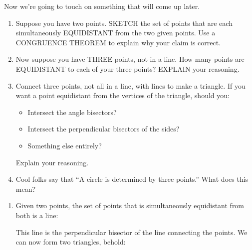 \documentclass[nooutcomes,noauthor,handout,12pt]{ximera}
\begin{document}
\begin{question}
  Now we're going to touch on something that will come up later.
  \begin{enumerate}
  \item Suppose you have two points. SKETCH the set of points that are
    each simultaneously EQUIDISTANT from the two given points. Use a
    CONGRUENCE THEOREM to explain why your claim is correct.
  \item Now suppose you have THREE points, not in a line. How many
    points are EQUIDISTANT to each of your three points? EXPLAIN your
    reasoning.
  \item Connect three points, not all in a line, with lines to make a
    triangle. If you want a point equidistant from the vertices of the
    triangle, should you:
    \begin{itemize}
    \item Intersect the angle bisectors?
    \item Intersect the perpendicular bisectors of the sides?
    \item Something else entirely?
    \end{itemize}
    Explain your reasoning.
  \item Cool folks say that ``A circle is determined by three
    points.'' What does this mean?
  \end{enumerate}
  \begin{freeResponse}
    \begin{enumerate}
    \item Given two points, the set of points that is simultaneously
      equidistant from both is a line:
      \begin{center}
      \end{center}
      This line is the perpendicular bisector of the line connecting
      the points. We can now form two triangles, behold:
      \begin{center}
\end{center}
\end{enumerate}
\end{freeResponse}
\end{question}
\end{document}
